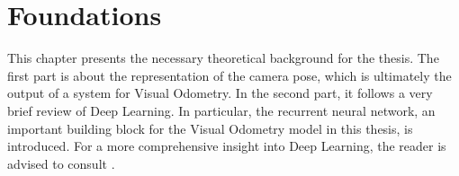 \chapter{Foundations}\label{chp:foundations}

	This chapter presents the necessary theoretical background for the thesis.
	The first part is about the representation of the camera pose, which is ultimately the output of a system for Visual Odometry.
	In the second part, it follows a very brief review of Deep Learning.
	In particular, the recurrent neural network, an important building block for the Visual Odometry model in this thesis, is introduced.
	For a more comprehensive insight into Deep Learning, the reader is advised to consult \cite{goodfellow2016deep}.
	
